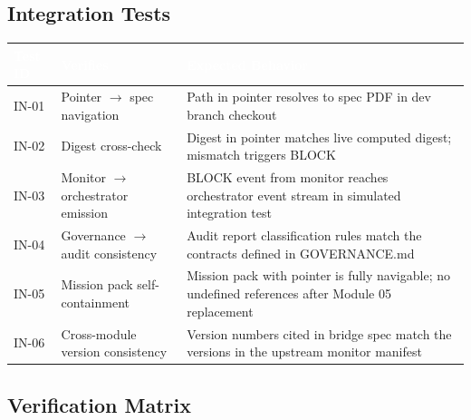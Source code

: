 \documentclass[11pt,letterpaper]{article}
\newcommand{\tableheader}[1]{\textbf{\sffamily\textcolor{white}{#1}}}
\begin{document}
\subsection{Integration Tests}

\begin{center}
\begin{tabularx}{\textwidth}{L{1.5cm}L{4.5cm}X}
\toprule
{}
\tableheader{Test ID} & \tableheader{Verifies} & \tableheader{Expected Behavior} \\
\midrule
IN-01 & Pointer $\rightarrow$ spec navigation & Path in pointer resolves to spec PDF in dev branch checkout \\
IN-02 & Digest cross-check & Digest in pointer matches live computed digest; mismatch triggers BLOCK \\
IN-03 & Monitor $\rightarrow$ orchestrator emission & BLOCK event from monitor reaches orchestrator event stream in simulated integration test \\
IN-04 & Governance $\rightarrow$ audit consistency & Audit report classification rules match the contracts defined in GOVERNANCE.md \\
IN-05 & Mission pack self-containment & Mission pack with pointer is fully navigable; no undefined references after Module 05 replacement \\
IN-06 & Cross-module version consistency & Version numbers cited in bridge spec match the versions in the upstream monitor manifest \\
\bottomrule
\end{tabularx}
\end{center}

\subsection{Verification Matrix}
\end{document}
